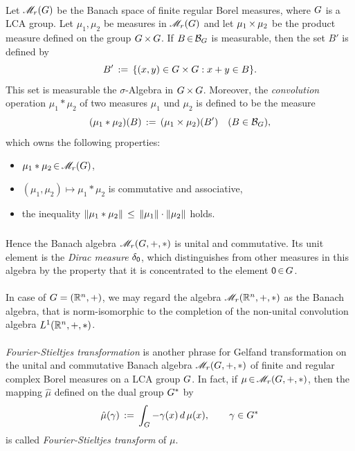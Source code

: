 \documentclass[11pt,twoside]{article}
\begin{document}
\paragraph{} %
Let $\mathscr{M}_{r}(G)$ be the Banach space of finite regular Borel measures,
where $G$ is a LCA group.
Let $\mu_1, \mu_2$ be measures in $\mathscr{M}_{r}(G)$ and let $\mu_1 {\,\times\,} \mu_2$
be the product measure defined on the group $G {\,\times\,} G$.
If $B {\,\in\,} {\mathcal{B}}_{G}$ is measurable,
then the set $B'$ is defined by
\[
B' \,:=\, \{(x,y) \in G \times G: x+y \in B\}.
\]
This set is measurable {\wrt} the $\sigma$-Algebra
in $G {\,\times\,} G$.
Moreover,
the \textit{convolution} operation $\mu_1 * \mu_2$
of two measures $\mu_1$ und $\mu_2$ is defined to be the measure
\[
(\mu_1 * \mu_2)(B) \,:=\, (\mu_1 \times \mu_2)(B')
\quad (B \in {\mathcal{B}}_{G}),
\]
which owns the following properties:

\begin{itemize}[leftmargin=12pt]
\item[1.]
$\mu_1 * \mu_2 {\,\in\,} \mathscr{M}_{r}(G)$,

\item[2.]
$(\mu_1,\mu_2) \mapsto \mu_1 * \mu_2$ is commutative and associative,

\item[3.]
the inequality
$\left\lVert \mu_1 * \mu_2 \right\rVert \, \leq \, \left\lVert \mu_1 \right\rVert \cdot \left\lVert \mu_2 \right\rVert$ holds.
\end{itemize}

\subparagraph{} %
Hence the Banach algebra $\mathscr{M}_{r}(G,+,*)$ is unital and commutative.
Its unit element is the \textit{Dirac measure} $\delta_{{\mathsf{0}}}$,
which distinguishes from other measures in this algebra by the property
that it is concentrated to the element ${\mathsf{0}} {\,\in\,} G$.

\paragraph{}
In case of $G=({\mathbb{R}}^n,+)$,
we may regard the algebra $\mathscr{M}_{r}({\mathbb{R}}^n,+,*)$ as the Banach algebra,
that is norm-isomorphic to the completion
of the non-unital convolution algebra $L^1({\mathbb{R}}^n,+,*)$.

\paragraph{} %
\textit{Fourier-Stieltjes transformation} is another phrase for
Gelfand transformation on the unital and commutative Banach algebra
$\mathscr{M}_{r}(G,+,*)$ of finite and regular complex Borel measures
on a LCA group $G$.
In fact,
if $\mu {\,\in\,} \mathscr{M}_{r}(G,+,*)$,
then the mapping $\hat{\mu}$ defined on the dual group $G^*$ by
\[
\hat{\mu}(\gamma) \,:=\,
\int_{G} -\gamma(x) \, d\, \mu(x), \quad \quad \gamma \in G^*
\]
is called \textit{Fourier-Stieltjes transform} of  $\mu$.
\end{document}
